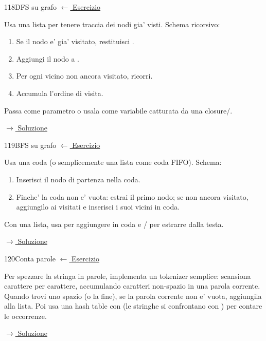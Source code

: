 \label{hint:118}
\begin{hintbox}{118}{DFS su grafo}
\small\color{black!55}\hyperref[ex:118]{$\leftarrow$ Esercizio}\normalsize\color{black}

Usa una lista  per tenere traccia dei nodi gia' visti.
Schema ricorsivo:
\begin{enumerate}[leftmargin=2em]
  \item Se il nodo e' gia' visitato, restituisci .
  \item Aggiungi il nodo a .
  \item Per ogni vicino non ancora visitato, ricorri.
  \item Accumula l'ordine di visita.
\end{enumerate}
Passa  come parametro o usala come variabile
catturata da una closure/.

\small\color{black!55}\hyperref[sol:118]{$\rightarrow$ Soluzione}\normalsize\color{black}
\end{hintbox}

\label{hint:119}
\begin{hintbox}{119}{BFS su grafo}
\small\color{black!55}\hyperref[ex:119]{$\leftarrow$ Esercizio}\normalsize\color{black}

Usa una coda (o semplicemente una lista come coda FIFO).
Schema:
\begin{enumerate}[leftmargin=2em]
  \item Inserisci il nodo di partenza nella coda.
  \item Finche' la coda non e' vuota:
        estrai il primo nodo; se non ancora visitato,
        aggiungilo ai visitati e inserisci i suoi vicini in coda.
\end{enumerate}
Con una lista, usa  per aggiungere in coda e
/ per estrarre dalla testa.

\small\color{black!55}\hyperref[sol:119]{$\rightarrow$ Soluzione}\normalsize\color{black}
\end{hintbox}

\label{hint:120}
\begin{hintbox}{120}{Conta parole}
\small\color{black!55}\hyperref[ex:120]{$\leftarrow$ Esercizio}\normalsize\color{black}

Per spezzare la stringa in parole, implementa un tokenizer
semplice: scansiona carattere per carattere, accumulando
caratteri non-spazio in una parola corrente.
Quando trovi uno spazio (o la fine), se la parola corrente
non e' vuota, aggiungila alla lista.
Poi usa una hash table con  (le stringhe
si confrontano con ) per contare le occorrenze.

\small\color{black!55}\hyperref[sol:120]{$\rightarrow$ Soluzione}\normalsize\color{black}
\end{hintbox}

